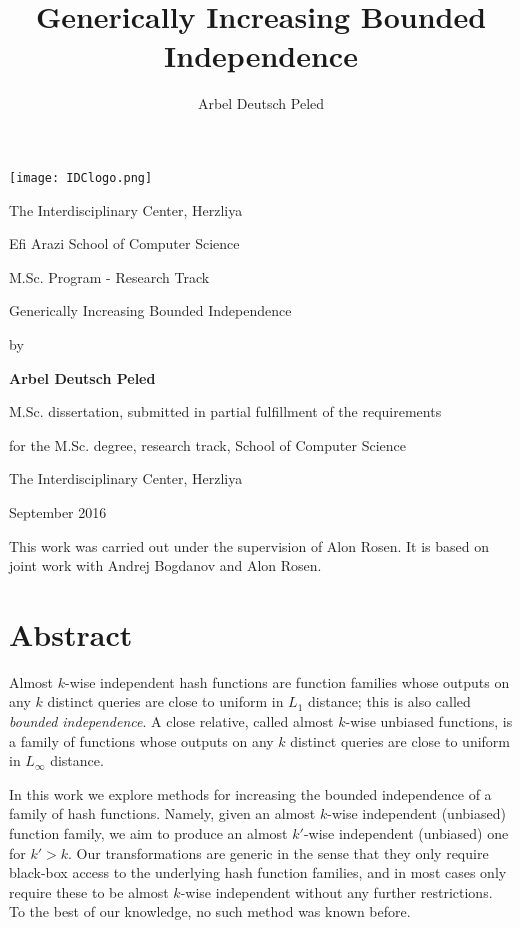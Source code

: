 \documentclass[12pt]{article}
\title{\textbf{Generically Increasing Bounded Independence}}
\author{Arbel Deutsch Peled}
\begin{document}
\begin{titlepage}
	\centering
	\texttt{[image: IDClogo.png]}\par\vspace{2cm}
	{\huge The Interdisciplinary Center, Herzliya \par}
	{\Large Efi Arazi School of Computer Science \par}
	{\Large M.Sc. Program - Research Track \par}
	
	\vspace{1cm}
	
	\vspace{1.5cm}
	{\Huge Generically Increasing Bounded Independence\par}
	\vspace{3cm}
	{\large by\par}
	{\large\bfseries Arbel Deutsch Peled\par}
	
	\vspace{2cm}
	
	{M.Sc. dissertation, submitted in partial fulfillment of the requirements\par}
	{for the M.Sc. degree, research track, School of Computer Science\par}
	{The Interdisciplinary Center, Herzliya}
	
	\vfill
	
	{\large September 2016\par}
\end{titlepage}

\newpage

This work was carried out under the supervision of Alon Rosen.
It is based on joint work with Andrej Bogdanov and Alon Rosen.

\newpage

\section*{Abstract}
	
	Almost $k$-wise independent hash functions are function families whose outputs on any $k$ distinct queries are close to uniform in $L_1$ distance; this is also called \emph{bounded independence}.
	A close relative, called almost $k$-wise unbiased functions, is a family of functions whose outputs on any $k$ distinct queries are close to uniform in $L_\infty$ distance.
	
	In this work we explore methods for increasing the bounded independence of a family of hash functions.
	Namely, given an almost $k$-wise independent (unbiased) function family, we aim to produce an almost $k'$-wise independent (unbiased) one for $k' > k$.
	Our transformations are generic in the sense that they only require black-box access to the underlying hash function families, and in most cases only require these to be almost $k$-wise independent without any further restrictions.
	To the best of our knowledge, no such method was known before.
	
\end{document}
